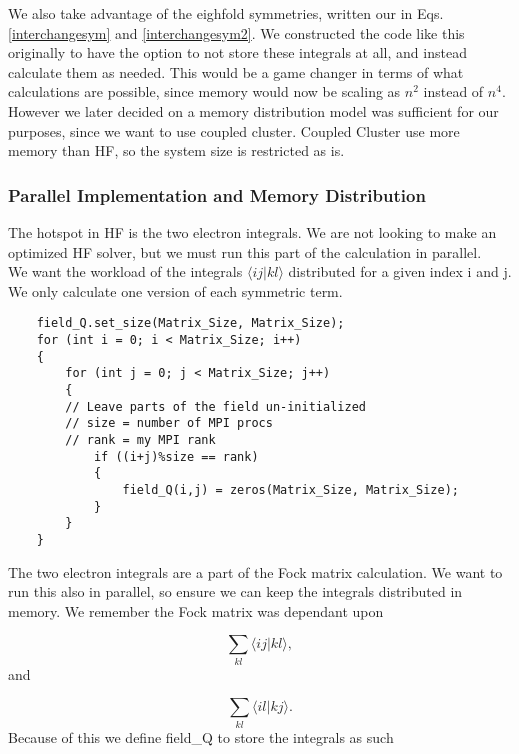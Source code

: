 We also take advantage of the eighfold symmetries, written our in Eqs. \eqref{interchangesym} and \eqref{interchangesym2}. We constructed the code like this originally to have the option to not store these integrals at all, and instead calculate them as needed. This would be a game changer in terms of what calculations are possible, since memory would now be scaling as $n^2$ instead of $n^4$. However we later decided on a memory distribution model was sufficient for our purposes, since we want to use coupled cluster. Coupled Cluster use more memory than HF, so the system size is restricted as is. 

\subsubsection{Parallel Implementation and Memory Distribution}
The hotspot in HF is the two electron integrals. We are not looking to make an optimized HF solver, but we must run this part of the calculation in parallel. \\

We want the workload of the integrals $\langle i j | k l \rangle$ distributed for a given index i and j. We only calculate one version of each symmetric term. \\

\begin{lstlisting}
    field_Q.set_size(Matrix_Size, Matrix_Size);
    for (int i = 0; i < Matrix_Size; i++)
    {
        for (int j = 0; j < Matrix_Size; j++)
        {
        // Leave parts of the field un-initialized
        // size = number of MPI procs
        // rank = my MPI rank
            if ((i+j)%size == rank)
            {
                field_Q(i,j) = zeros(Matrix_Size, Matrix_Size);
            }
        }
    }
\end{lstlisting}

The two electron integrals are a part of the Fock matrix calculation. We want to run this also in parallel, so ensure we can keep the integrals distributed in memory. We remember the Fock matrix was dependant upon 

\begin{equation}
\sum_{kl} \langle i j | k l \rangle ,
\end{equation}
and

\begin{equation}
\sum_{kl} \langle i l | k j \rangle .
\end{equation}
Because of this we define field\_Q to store the integrals as such


